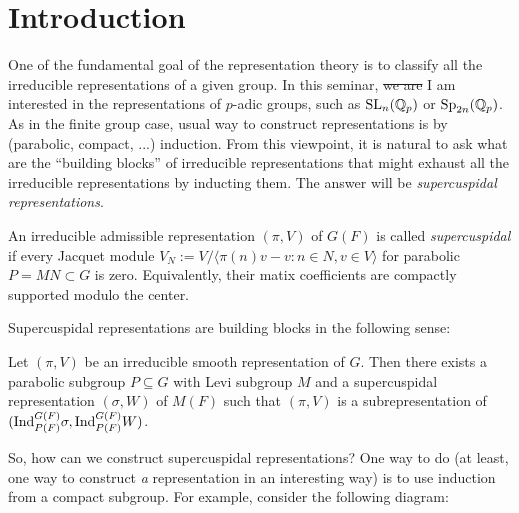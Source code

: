 \section{Introduction}
\label{sec:intro}

One of the fundamental goal of the representation theory is to classify all the irreducible representations of a given group.
In this seminar, \sout{we are} I am interested in the representations of $p$-adic groups, such as $\mathrm{SL}_{n}(\mathbb{Q}_{p})$ or $\mathrm{Sp}_{2n}(\mathbb{Q}_p)$.
As in the finite group case, usual way to construct representations is by (parabolic, compact, ...) induction.
From this viewpoint, it is natural to ask what are the ``building blocks'' of irreducible representations that might exhaust all the irreducible representations by inducting them.
The answer will be \emph{supercuspidal representations}.

\begin{definition}
An irreducible admissible representation $(\pi, V)$ of $G(F)$ is called \emph{supercuspidal} if every Jacquet module $V_N := V / \langle \pi(n) v - v: n \in N, v \in V\rangle$ for parabolic $P = MN \subset G$ is zero.
Equivalently, their matix coefficients are compactly supported modulo the center.
\end{definition}


Supercuspidal representations are building blocks in the following sense:
\begin{theorem}
Let $(\pi, V)$ be an irreducible smooth representation of $G$.
Then there exists a parabolic subgroup $P \subseteq G$ with Levi subgroup $M$ and a supercuspidal representation $(\sigma, W)$ of $M(F)$ such that $(\pi, V)$ is a subrepresentation of $(\mathrm{Ind}_{P(F)}^{G(F)} \sigma, \mathrm{Ind}_{P(F)}^{G(F)} W)$.
\end{theorem}

So, how can we construct supercuspidal representations?
One way to do (at least, one way to construct \emph{a} representation in an interesting way) is to use induction from a compact subgroup.
For example, consider the following diagram:

